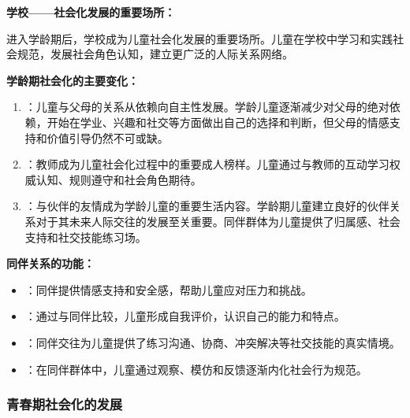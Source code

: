 \begin{keybox}
\textbf{学校——社会化发展的重要场所：}

进入学龄期后，学校成为儿童社会化发展的重要场所。儿童在学校中学习和实践社会规范，发展社会角色认知，建立更广泛的人际关系网络。

\textbf{学龄期社会化的主要变化：}
\begin{enumerate}[leftmargin=*]
    \item {}：儿童与父母的关系从依赖向自主性发展。学龄儿童逐渐减少对父母的绝对依赖，开始在学业、兴趣和社交等方面做出自己的选择和判断，但父母的情感支持和价值引导仍然不可或缺。

    \item {}：教师成为儿童社会化过程中的重要成人榜样。儿童通过与教师的互动学习权威认知、规则遵守和社会角色期待。

    \item {}：与伙伴的友情成为学龄儿童的重要生活内容。学龄期儿童建立良好的伙伴关系对于其未来人际交往的发展至关重要。同伴群体为儿童提供了归属感、社会支持和社交技能练习场。
\end{enumerate}

\textbf{同伴关系的功能：}
\begin{itemize}[leftmargin=*]
    \item {}：同伴提供情感支持和安全感，帮助儿童应对压力和挑战。
    \item {}：通过与同伴比较，儿童形成自我评价，认识自己的能力和特点。
    \item {}：同伴交往为儿童提供了练习沟通、协商、冲突解决等社交技能的真实情境。
    \item {}：在同伴群体中，儿童通过观察、模仿和反馈逐渐内化社会行为规范。
\end{itemize}
\end{keybox}

\subsubsection{青春期社会化的发展}


